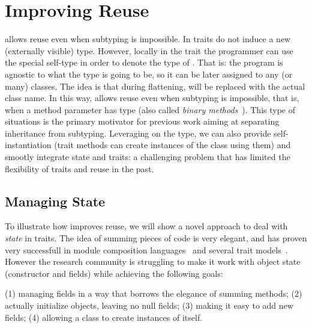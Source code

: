 \section{Improving Reuse}
\name allows reuse even when subtyping is impossible.
In \name traits do not induce a new (externally visible) type.
However, locally in the trait the programmer can use the special self-type \Q@This@ in order to denote the 
type of \Q@this@.
That is: the program is agnostic to what the \Q@This@ type is going to be, so it can
be later assigned to any (or many) classes. 
The idea is that during flattening, \Q@This@ will be replaced with the actual class name.
In this way, \name allows reuse even when subtyping is
impossible, that is, when a method parameter has type \Q@This@ (also called \emph{binary
  methods}~\cite{bruce96binary}). 
This type of situations is the primary motivator
for previous work aiming at separating inheritance from subtyping.
Leveraging on the \Q@This@ type, we can also provide self-instantiation (trait methods can create instances of the class using them) and smootly integrate state and traits: a challenging problem that has limited the flexibility of traits and
reuse in the past.

\subsection{Managing State}

To illustrate how \name improves reuse, we will show a novel approach
to deal with \emph{state} in traits.  The idea of summing pieces of
code is very elegant, and has proven very successfull in module
composition languages~\cite{ancona2002calculus} and several trait
models~\cite{Traits:ECOOP2003,Bergel2007,BETTINI2013521,DBLP:journals/iandc/LagorioSZ12}.  However the research
community is struggling to make it work with object state (constructor
and fields) while achieving the following goals:

(1) managing fields in a way that borrows the elegance of summing methods;
(2) actually initialize objects, leaving no null fields;
(3) making it easy to add new fields;
(4) allowing a class to create instances of itself.

